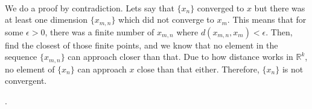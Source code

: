 \documentclass{article}
\begin{document}
\begin{customproof}
\

We do a proof by contradiction. Lets say that $\{x_n\}$ converged to $x$ but there was at least one dimension $\{x_{m,n}\}$ which did not converge to $x_m$. This means that for some $\epsilon > 0$, there was a finite number of $x_{m,n}$ where $d(x_{m,n}, x_m) < \epsilon$. Then, find the closest of those finite points, and we know that no element in the sequence $\{x_{m,n}\}$ can approach closer than that. Due to how distance works in $\mathbb{R}^k$, no element of $\{x_n\}$ can approach $x$ close than that either. Therefore, $\{x_n\}$ is not convergent. 
\end{customproof}

.
\end{document}
